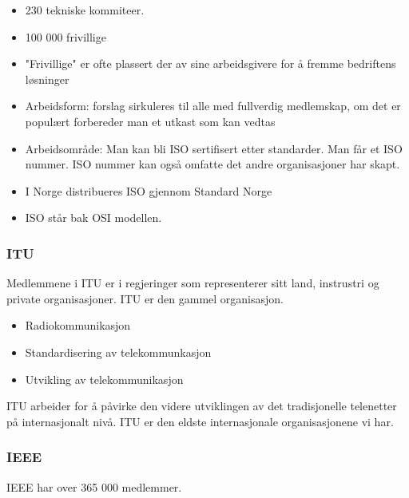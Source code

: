 \documentclass{article}
\begin{document}
\begin{flushleft}
        \begin{itemize}
            \item 230 tekniske kommiteer.
            \item 100 000 frivillige
            \item "Frivillige" er ofte plassert der av sine arbeidsgivere for å fremme bedriftens løsninger
            \item Arbeidsform: forslag sirkuleres til alle med fullverdig medlemskap, om det er populært forbereder man et utkast som kan vedtas
            \item Arbeidsområde: Man kan bli ISO sertifisert etter standarder. Man får et ISO nummer. ISO nummer kan også omfatte det andre organisasjoner har skapt.
            \item I Norge distribueres ISO gjennom Standard Norge
            \item ISO står bak OSI modellen.
        \end{itemize}

        \subsubsection{ITU}
        Medlemmene i ITU er i regjeringer som representerer sitt land, instrustri og private organisasjoner. 
        ITU er den gammel organisasjon. 
        \begin{itemize}
            \item Radiokommunikasjon
            \item Standardisering av telekommunkasjon
            \item Utvikling av telekommunikasjon
        \end{itemize}

        ITU arbeider for å påvirke den videre utviklingen av det tradisjonelle telenetter på internasjonalt nivå.
        ITU er den eldste internasjonale organisasjonene vi har. 

        \subsubsection{IEEE}
        IEEE har over 365 000 medlemmer. 
        


        

    \end{flushleft}
\end{document}

